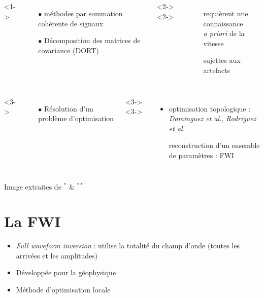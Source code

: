 \documentclass[10pt,xcolor=x11names,compress, notes=show]{beamer}%
\begin{document}
\begin{frame}{\insertsectionhead}
\begin{columns}[c]
	\end{columns}
	\vspace{0.3cm}
	\begin{columns}[c]
			<1->
				\begin{itemize}
					\item[$\bullet$] méthodes par sommation cohérente de signaux
					\item[$\bullet$] Décomposition des matrices de covariance (DORT)
				\end{itemize}
			<2->
			<2->
				\begin{itemize}
					\item[\ding{55}] requièrent une connaissance\\ \emph{a priori} de la vitesse\\
					\item[\ding{55}] sujettes aux artefacts
				\end{itemize}
	\end{columns}
	\begin{columns}[c]
		<3->
			\begin{itemize}
				\item[$\bullet$] Résolution d'un problème d'optimisation
			\end{itemize}
		<3->
		<3->
			\begin{itemize}
			\item optimisation topologique :\\\hspace{-0.5cm}\small{\emph{Dominguez et al.}, \emph{Rodriguez et al.}}\\[0.1cm]
			\item[\ding{51}] \normalsize{reconstruction d'un ensemble de paramètres : FWI}
		\end{itemize}		
	\end{columns}
	\vfill
	{\tiny Image extraites de $^{*}$\cite{chassignole} \& $^{**}$\cite{gardahaut} \vspace{-0.5cm}}
\end{frame} 


\section{La FWI}
\begin{frame}{\insertsectionhead}
	\begin{itemize}
		\item \emph{Full waveform inversion} : utilise la totalité du champ d'onde (toutes les arrivées et les amplitudes)
		\item Développée pour la géophysique
		\item Méthode d'optimisation locale
	\end{itemize}

\end{frame}
\end{document}
